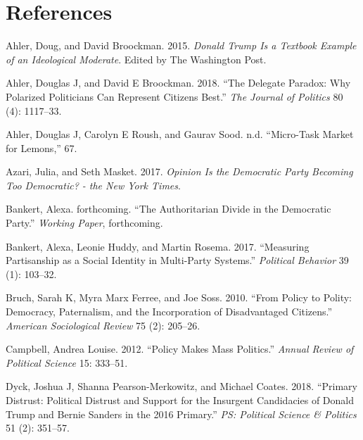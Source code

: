\documentclass[
]{article}
\newlength{\cslhangindent}
\newenvironment{CSLReferences}[2] %
 {%
  \setlength{\parindent}{0pt}
  \ifodd #1 \everypar{\setlength{\hangindent}{\cslhangindent}}\ignorespaces\fi
  \ifnum #2 > 0
  \setlength{\parskip}{#2\baselineskip}
  \fi
 }%
 {}
\begin{document}
\clearpage

\hypertarget{references}{%
\section{References}\label{references}}

\hypertarget{refs}{}
\begin{CSLReferences}{1}{0}
\leavevmode{}%
Ahler, Doug, and David Broockman. 2015. \emph{Donald Trump Is a Textbook Example of an Ideological Moderate}. Edited by The Washington Post.

\leavevmode{}%
Ahler, Douglas J, and David E Broockman. 2018. {``The Delegate Paradox: Why Polarized Politicians Can Represent Citizens Best.''} \emph{The Journal of Politics} 80 (4): 1117--33.

\leavevmode{}%
Ahler, Douglas J, Carolyn E Roush, and Gaurav Sood. n.d. {``Micro-{Task Market} for {Lemons},''} 67.

\leavevmode{}%
Azari, Julia, and Seth Masket. 2017. \emph{Opinion \textbar{} Is the Democratic Party Becoming Too Democratic? - the New York Times}.

\leavevmode{}%
Bankert, Alexa. forthcoming. {``The Authoritarian Divide in the Democratic Party.''} \emph{Working Paper}, forthcoming.

\leavevmode{}%
Bankert, Alexa, Leonie Huddy, and Martin Rosema. 2017. {``Measuring Partisanship as a Social Identity in Multi-Party Systems.''} \emph{Political Behavior} 39 (1): 103--32.

\leavevmode{}%
Bruch, Sarah K, Myra Marx Ferree, and Joe Soss. 2010. {``From Policy to Polity: Democracy, Paternalism, and the Incorporation of Disadvantaged Citizens.''} \emph{American Sociological Review} 75 (2): 205--26.

\leavevmode{}%
Campbell, Andrea Louise. 2012. {``Policy Makes Mass Politics.''} \emph{Annual Review of Political Science} 15: 333--51.

\leavevmode{}%
Dyck, Joshua J, Shanna Pearson-Merkowitz, and Michael Coates. 2018. {``Primary Distrust: Political Distrust and Support for the Insurgent Candidacies of Donald Trump and Bernie Sanders in the 2016 Primary.''} \emph{PS: Political Science \& Politics} 51 (2): 351--57.


\end{CSLReferences}
\end{document}
